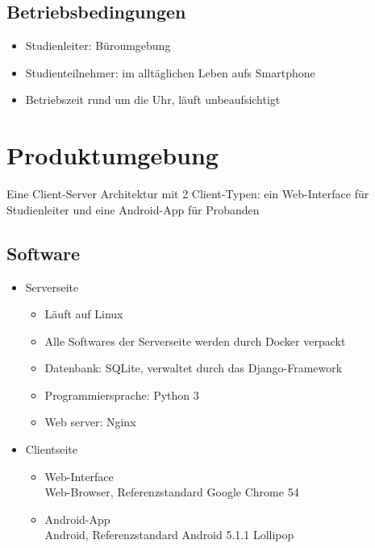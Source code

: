 \documentclass[a4paper]{scrreprt}
\begin{document}
        \section{Betriebsbedingungen}
            \begin{itemize}
                \item \gls{Studienleiter}: Büroumgebung
                \item Studienteilnehmer: im alltäglichen Leben aufs Smartphone
                \item Betriebszeit rund um die Uhr, läuft unbeaufsichtigt
            \end{itemize}

    \chapter{Produktumgebung}
        Eine Client-Server Architektur mit 2 Client-Typen: ein \gls{Web-Interface} für \gls{Studienleiter} und eine \gls{Android-App} für \gls{Proband}en

        \section{Software}
            \begin{itemize}
                \item Serverseite
                    \begin{itemize}
                        \item  Läuft auf Linux
                        \item Alle Softwares der Serverseite werden durch Docker verpackt
                        \item Datenbank: SQLite, verwaltet durch das Django-Framework
                        \item Programmiersprache: Python 3
                        \item Web server: Nginx
                    \end{itemize}
                \item Clientseite
                    \begin{itemize}
                        \item \gls{Web-Interface}\\
                             Web-Browser, Referenzstandard Google Chrome 54
                        \item  \gls{Android-App}\\
                             Android, Referenzstandard Android 5.1.1 Lollipop
                    \end{itemize}
            \end{itemize}
\end{document}
